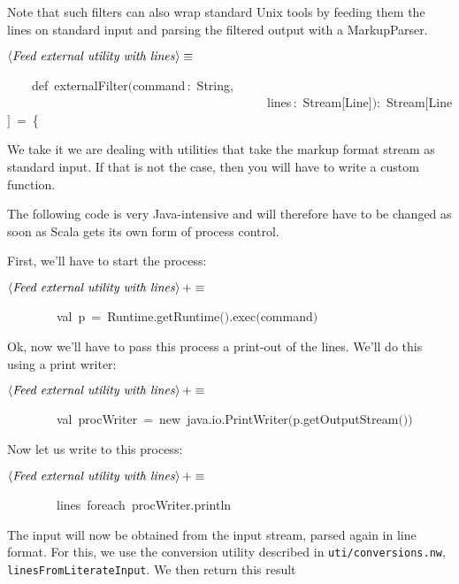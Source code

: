 \documentclass[a4paper,12pt]{article}
\begin{document}
Note that such filters can also wrap standard Unix tools by feeding them
the lines on standard input and parsing the filtered output with a MarkupParser.

$\left<\mbox{\emph{Feed external utility with lines}}\right>\equiv$
\begin{program}~~~~{\vem def}~externalFilter$($command\,{\rm :}~String,
\\~~~~~~~~~~~~~~~~~~~~~~~~~~~~~~~~~~~~~~~~~~lines\,{\rm :}~Stream$[$Line$]$$)${\rm :}~Stream$[$Line$]$~=~{\small\{}
\end{program}



We take it we are dealing with utilities that take the markup format stream
as standard input. If that is not the case, then you will have to write a custom
function.

The following code is very Java-intensive and will therefore have to be changed
as soon as Scala gets its own form of process control.

First, we'll have to start the process:

$\left<\mbox{\emph{Feed external utility with lines}}\right>+\equiv$
\begin{program}~~~~~~~~{\vem val}~p~=~Runtime.getRuntime$($$)$.exec$($command$)$
\\[0.5em]\end{program}


Ok, now we'll have to pass this process a print-out of the lines. We'll do this
using a print writer:

$\left<\mbox{\emph{Feed external utility with lines}}\right>+\equiv$
\begin{program}~~~~~~~~{\vem val}~procWriter~=~{\vem new}~java.io.PrintWriter$($p.getOutputStream$($$)$$)$
\\[0.5em]\end{program}


Now let us write to this process:

$\left<\mbox{\emph{Feed external utility with lines}}\right>+\equiv$
\begin{program}~~~~~~~~lines~foreach~procWriter.println
\\[0.5em]\end{program}


The input will now be obtained from the input stream, parsed again in line format.
For this, we use the conversion utility described in \texttt{uti/conversions.nw},
\texttt{linesFromLiterateInput}. We then return this result
\end{document}
